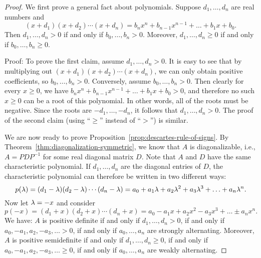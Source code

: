 \begin{proof}
  We first prove a general fact about polynomials. Suppose $d_1,\ldots,d_n$
  are real numbers and
  \begin{equation*}
    (x+d_1)(x+d_2)\cdots(x+d_n) = b_nx^n + b_{n-1}x^{n-1} + \ldots +
    b_1x + b_0.
  \end{equation*}
  Then $d_1,\ldots,d_n > 0$ if and only if $b_0,\ldots,b_n > 0$.
  Moreover, $d_1,\ldots,d_n \geq 0$ if and only if $b_0,\ldots,b_n \geq 0$.

  Proof: To prove the first claim, assume $d_1,\ldots,d_n > 0$. It is
  easy to see that by multiplying out $(x+d_1)(x+d_2)\cdots(x+d_n)$,
  we can only obtain positive coefficients, so $b_0,\ldots,b_n >
  0$. Conversely, assume $b_0,\ldots,b_n > 0$. Then clearly for every
  $x\geq 0$, we have $b_nx^n + b_{n-1}x^{n-1} + \ldots + b_1x + b_0 >
  0$, and therefore no such $x\geq 0$ can be a root of this
  polynomial.  In other words, all of the roots must be
  negative. Since the roots are $-d_1,\ldots,-d_n$, it follows that
  $d_1,\ldots,d_n>0$. The proof of the second claim (using ``$\geq$''
  instead of ``$>$'') is similar.
  
  We are now ready to prove
  Proposition~\ref{prop:descartes-rule-of-signs}. By
  Theorem~\ref{thm:diagonalization-symmetric}, we know that $A$ is
  diagonalizable, i.e., $A=PDP^{-1}$ for some real diagonal matrix
  $D$. Note that $A$ and $D$ have the same characteristic
  polynomial. If $d_1,\ldots,d_n$ are the diagonal entries of $D$, the
  characteristic polynomial can therefore be written in two different
  ways:
  \begin{equation*}
    p(\lambda)
    = (d_1-\lambda)(d_2-\lambda)\cdots(d_n-\lambda)
    = a_0 + a_1\lambda + a_2\lambda^2 + a_3\lambda^3 + \ldots + a_n\lambda^n.
  \end{equation*}
  Now let $\lambda=-x$ and consider
  \begin{equation*}
    p(-x) = (d_1+x)(d_2+x)\cdots(d_n+x)
    = a_0 - a_1 x + a_2 x^2 - a_3x^3 + \ldots \pm a_n x^n.
  \end{equation*}
  We have: $A$ is positive definite if and only if $d_1,\ldots,d_n>0$,
  if and only if $a_0,-a_1,a_2,-a_3,\ldots > 0$, if and only if
  $a_0,\ldots,a_n$ are strongly alternating.  Moreover, $A$ is
  positive semidefinite if and only if $d_1,\ldots,d_n\geq 0$, if and
  only if $a_0,-a_1,a_2,-a_3,\ldots \geq 0$, if and only if
  $a_0,\ldots,a_n$ are weakly alternating.
\end{proof}

